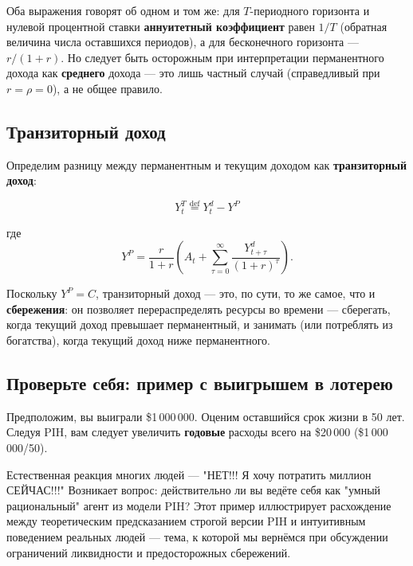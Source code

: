 \documentclass[10pt,a4paper]{article}
\begin{document}
\begin{intuition}
Оба выражения говорят об одном и том же: для $T$-периодного горизонта и нулевой процентной ставки \textbf{аннуитетный коэффициент} равен $1/T$ (обратная величина числа оставшихся периодов), а для бесконечного горизонта — $r/(1+r)$. Но следует быть осторожным при интерпретации перманентного дохода как \textbf{среднего} дохода — это лишь частный случай (справедливый при $r=\rho=0$), а не общее правило.
\end{intuition}

\subsection{Транзиторный доход}

Определим разницу между перманентным и текущим доходом как \textbf{транзиторный доход}:
\begin{formulabox}
\begin{equation}
Y_t^{T} \overset{\text{def}}{=} Y_t^{d} - Y^{P} \tag{7.4}
\end{equation}
\end{formulabox}
где
$$Y^{P} = \frac{r}{1+r}\left(A_t + \sum_{\tau=0}^{\infty}\frac{Y_{t+\tau}^{d}}{(1+r)^\tau}\right).$$

Поскольку $Y^{P}=C$, транзиторный доход — это, по сути, то же самое, что и \textbf{сбережения}: он позволяет перераспределять ресурсы во времени — сберегать, когда текущий доход превышает перманентный, и занимать (или потреблять из богатства), когда текущий доход ниже перманентного.

\subsection{Проверьте себя: пример с выигрышем в лотерею}

Предположим, вы выиграли \$1\,000\,000. Оценим оставшийся срок жизни в 50 лет. Следуя PIH, вам следует увеличить \textbf{годовые} расходы всего на \$20\,000 (\$1\,000\,000/50).

\begin{intuition}
Естественная реакция многих людей — "НЕТ!!! Я хочу потратить миллион СЕЙЧАС!!!" Возникает вопрос: действительно ли вы ведёте себя как "умный рациональный" агент из модели PIH? Этот пример иллюстрирует расхождение между теоретическим предсказанием строгой версии PIH и интуитивным поведением реальных людей — тема, к которой мы вернёмся при обсуждении ограничений ликвидности и предосторожных сбережений.
\end{intuition}
\end{document}
